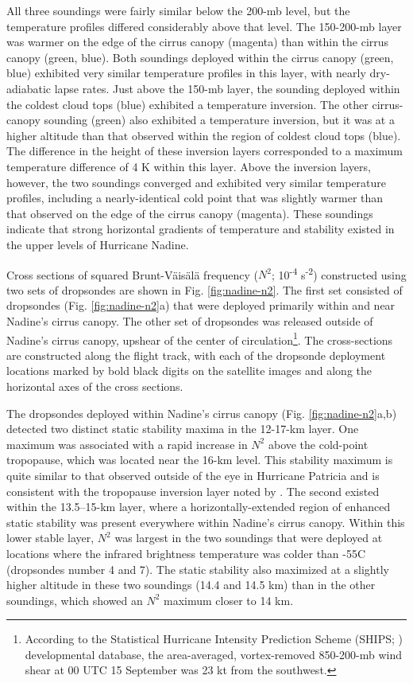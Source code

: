 All three soundings were fairly similar below the 200-mb level, but the temperature profiles differed considerably above that level.
The 150-200-mb layer was warmer on the edge of the cirrus canopy (magenta) than within the cirrus canopy (green, blue).
Both soundings deployed within the cirrus canopy (green, blue) exhibited very similar temperature profiles in this layer, with nearly dry-adiabatic lapse rates.
Just above the 150-mb layer, the sounding deployed within the coldest cloud tops (blue) exhibited a temperature inversion.
The other cirrus-canopy sounding (green) also exhibited a temperature inversion, but it was at a higher altitude than that observed within the region of coldest cloud tops (blue).
The difference in the height of these inversion layers corresponded to a maximum temperature difference of 4 K within this layer.
Above the inversion layers, however, the two soundings converged and exhibited very similar temperature profiles, including a nearly-identical cold point that was slightly warmer than that observed on the edge of the cirrus canopy (magenta).
These soundings indicate that strong horizontal gradients of temperature and stability existed in the upper levels of Hurricane Nadine.

Cross sections of squared Brunt-V{\"a}is{\"a}l{\"a} frequency ($N^2$; 10\textsuperscript{-4} s\textsuperscript{-2}) constructed using two sets of dropsondes are shown in Fig. \ref{fig:nadine-n2}.
The first set consisted of dropsondes (Fig. \ref{fig:nadine-n2}a) that were deployed primarily within and near Nadine's cirrus canopy.
The other set of dropsondes was released outside of Nadine's cirrus canopy, upshear of the center of circulation\footnote{According to the Statistical Hurricane Intensity Prediction Scheme (SHIPS; \citeauthor{DeMariaetal2005} \citeyear{DeMariaetal2005}) developmental database, the area-averaged, vortex-removed 850-200-mb wind shear at 00 UTC 15 September was 23 kt from the southwest.}.
The cross-sections are constructed along the flight track, with each of the dropsonde deployment locations marked by bold black digits on the satellite images and along the horizontal axes of the cross sections.

The dropsondes deployed within Nadine's cirrus canopy (Fig. \ref{fig:nadine-n2}a,b) detected two distinct static stability maxima in the 12-17-km layer.
One maximum was associated with a rapid increase in $N^2$ above the cold-point tropopause, which was located near the 16-km level.
This stability maximum is quite similar to that observed outside of the eye in Hurricane Patricia \citep{DuranMolinari2018} and is consistent with the tropopause inversion layer noted by \cite{Wirth2003}.
The second existed within the 13.5--15-km layer, where a horizontally-extended region of enhanced static stability was present everywhere within Nadine's cirrus canopy.
Within this lower stable layer, $N^2$ was largest in the two soundings that were deployed at locations where the infrared brightness temperature was colder than -55\textdegree{}C (dropsondes number 4 and 7).
The static stability also maximized at a slightly higher altitude in these two soundings (14.4 and 14.5 km) than in the other soundings, which showed an $N^2$ maximum closer to 14 km.

